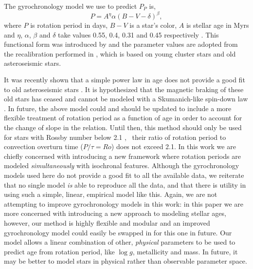The gyrochronology model we use to predict $P_P$ is, %
\begin{equation}
    P = A^\eta \alpha (B-V - \delta)^\beta,
\label{eqn:gyro}
\end{equation}
where $P$ is rotation period in days, $B-V$ is a star's color, $A$ is stellar
age in Myrs and $\eta$, $\alpha$, $\beta$ and $\delta$ take values 0.55, 0.4,
0.31 and 0.45 respectively \citep{angus2015}.
This functional form was introduced by \citep{barnes2007} and the parameter
values are adopted from the recalibration performed in \citet{angus2015},
which is based on young cluster stars and old asteroseismic stars.

It was recently shown that a simple power law in age does not provide a good
fit to old asteroseismic stars \citep{angus2015, vansaders2016}.
It is hypothesized that the magnetic braking of these old stars has ceased and
cannot be modeled with a Skumanich-like spin-down law \citep{vansaders2016}.
In future, the above model could and should be updated to include a more
flexible treatment of rotation period as a function of age in order to account
for the change of slope in the relation.
Until then, this method should only be used for stars with Rossby number below
2.1 \citep{vansaders2016}, \ie\ their ratio of rotation period to convection
overturn time ($P/\tau = Ro$) does not exceed 2.1.
In this work we are chiefly concerned with introducing a new framework where
rotation periods are modeled {\it simultaneously} with isochronal features.
Although the gyrochronology models used here do not provide a good fit to all
the available data, we reiterate that no single model {\it is} able to
reproduce all the data, and that there is utility in using such a simple,
linear, empirical model like this.
Again, we are not attempting to improve gyrochronology models in this work: in
this paper we are more concerned with introducing a new approach to modeling
stellar ages, however, our method is highly flexible and modular and an
improved gyrochronology model could easily be swapped in for this one in
future.
Our model allows a linear combination of other, {\it physical} parameters to
be used to predict age from rotation period, like $\log g$, metallicity and
mass.
In future, it may be better to model stars in physical rather than observable
parameter space.

